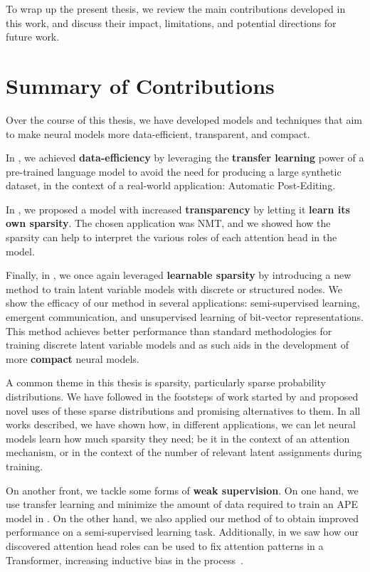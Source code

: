 \label{chap:conclusions}

\cleardoublepage
\doublespacing

\noindent To wrap up the present thesis, we review the main contributions
developed in this work, and discuss their impact, limitations, and
potential directions for future work.

\section{Summary of Contributions}

\noindent Over the course of this thesis, we have developed models and
techniques that aim to make neural models more data-efficient, transparent,
and compact.

In , we achieved \textbf{data-efficiency} by
leveraging the \textbf{transfer learning} power of a pre-trained
language model to avoid the need for producing a large synthetic
dataset, in the context of a real-world application: Automatic
Post-Editing.

In , we proposed a model with increased
\textbf{transparency} by letting it \textbf{learn its own sparsity}.
The chosen application was NMT, and we showed
how the sparsity can help to interpret the various roles of each
attention head in the model.

Finally, in , we once again leveraged
\textbf{learnable sparsity} by introducing a new method to train
latent variable models with discrete or structured nodes. We show the
efficacy of our method in several applications: semi-supervised
learning, emergent communication, and unsupervised learning of
bit-vector representations. This method achieves better performance
than standard methodologies for training discrete latent variable
models and as such aids in the development of more \textbf{compact}
neural models.

A common theme in this thesis is sparsity, particularly
sparse probability distributions. We have followed in the footsteps
of work started by \citet{sparsemax} and proposed novel uses of
these sparse distributions and promising alternatives to them.
In all works described, we have shown how, in different applications,
we can let neural models learn how much sparsity they need; be it
in the context of an attention mechanism, or in the context of
the number of relevant latent assignments during training.

On another front, we tackle some forms of \textbf{weak supervision}.
On one hand, we use transfer learning and minimize the amount of data
required to train an APE model in . On the other
hand, we also applied our method of  to
obtain improved performance on a semi-supervised learning task.
Additionally, in  we saw how our
discovered attention head roles can be used to fix attention patterns
in a Transformer, increasing inductive bias in the
process~\citep{raganato2020FixedEncoderSelfAttentiona}.


